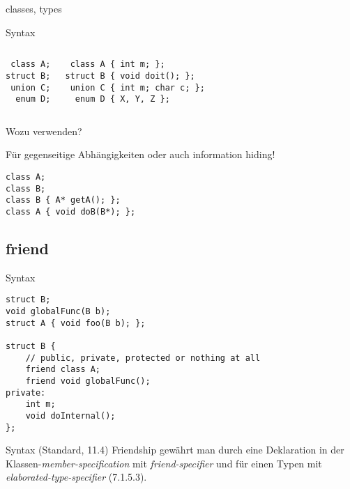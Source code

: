 \begin{frame}[fragile]{classes, types}
	\begin{block}{Syntax}
		\begin{columns}[t]
			\begin{lstlisting}
 class A;
struct B;
 union C;
  enum D;
			\end{lstlisting}
			
			\begin{lstlisting}
 class A { int m; };
struct B { void doit(); };
 union C { int m; char c; };
  enum D { X, Y, Z };
			\end{lstlisting}
		\end{columns}
	\end{block}
	
	\pause
	
	Wozu verwenden?
	\pause
	
	Für gegenseitige Abhängigkeiten oder auch information hiding!
	\begin{lstlisting}
class A;
class B;
class B { A* getA(); };
class A { void doB(B*); };
	\end{lstlisting}
\end{frame}




\subsection{friend}

\begin{frame}[fragile]{Syntax}
	\begin{lstlisting}
struct B;
void globalFunc(B b);
struct A { void foo(B b); };

struct B {
    // public, private, protected or nothing at all
    friend class A;
    friend void globalFunc();
private:
    int m;
    void doInternal();
};
	\end{lstlisting}
	
	\pause
	
	\begin{block}{Syntax (Standard, 11.4)}
		Friendship gewährt man durch eine Deklaration in der Klassen-\emph{member-specification} mit \emph{friend-specifier} und für einen Typen mit \emph{elaborated-type-specifier} (7.1.5.3).
	\end{block}
\end{frame}


